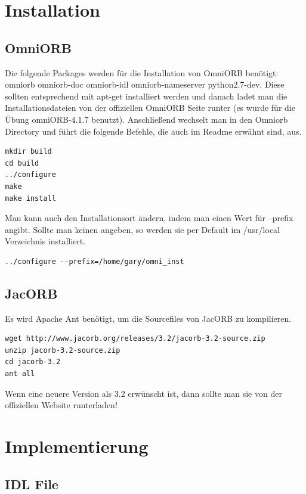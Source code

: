 \documentclass[11pt]{article}
\begin{document}
\section{Installation}

\subsection{OmniORB}

Die folgende Packages werden für die Installation von OmniORB benötigt: omniorb omniorb-doc omniorb-idl omniorb-nameserver python2.7-dev. Diese sollten entsprechend mit apt-get installiert werden und danach ladet man die Installationsdateien von der offiziellen OmniORB Seite \cite{omniorbpage} runter (es wurde für die Übung omniORB-4.1.7 benutzt). Anschließend wechselt man in den Omniorb Directory und führt die folgende Befehle, die auch im Readme erwähnt sind, aus.

\begin{lstlisting}
mkdir build
cd build
../configure
make
make install
\end{lstlisting}

Man kann auch den Installationsort ändern, indem man einen Wert für --prefix angibt. Sollte man keinen angeben, so werden sie per Default im /usr/local Verzeichnis installiert.

\begin{lstlisting}
../configure --prefix=/home/gary/omni_inst
\end{lstlisting}

\subsection{JacORB}

Es wird Apache Ant benötigt, um die Sourcefiles von JacORB zu kompilieren.

\begin{lstlisting}
wget http://www.jacorb.org/releases/3.2/jacorb-3.2-source.zip
unzip jacorb-3.2-source.zip
cd jacorb-3.2
ant all
\end{lstlisting}

Wenn eine neuere Version als 3.2 erwünscht ist, dann sollte man sie von der offiziellen Website runterladen!\cite{jacorbpage}

\section{Implementierung}

\subsection{IDL File}
\end{document}
